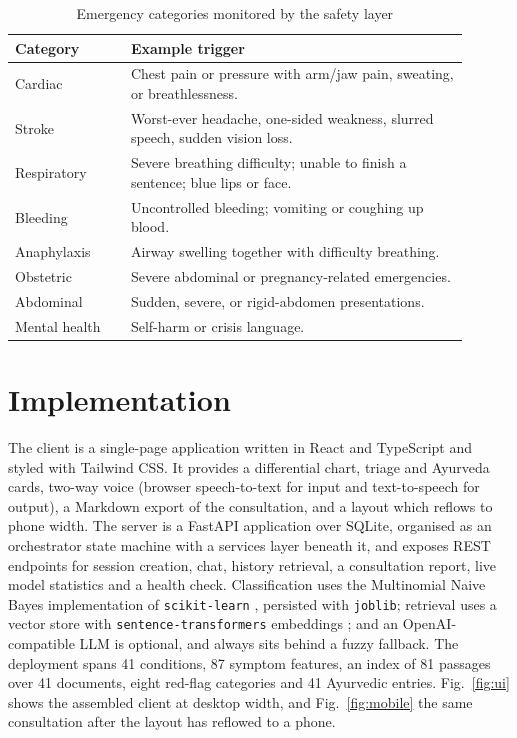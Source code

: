 \documentclass[conference]{IEEEtran}
\newcommand{\code}[1]{\texttt{\small #1}}
\begin{document}
\begin{table}[t]
\caption{Emergency categories monitored by the safety layer}
\label{tab:redflag}
\centering
\footnotesize
\begin{tabular}{@{}p{0.23\linewidth} p{0.67\linewidth}@{}}
\toprule
\textbf{Category} & \textbf{Example trigger}\\
\midrule
Cardiac & Chest pain or pressure with arm/jaw pain, sweating, or
breathlessness.\\[1pt]
Stroke & Worst-ever headache, one-sided weakness, slurred speech, sudden
vision loss.\\[1pt]
Respiratory & Severe breathing difficulty; unable to finish a sentence; blue
lips or face.\\[1pt]
Bleeding & Uncontrolled bleeding; vomiting or coughing up blood.\\[1pt]
Anaphylaxis & Airway swelling together with difficulty breathing.\\[1pt]
Obstetric & Severe abdominal or pregnancy-related emergencies.\\[1pt]
Abdominal & Sudden, severe, or rigid-abdomen presentations.\\[1pt]
Mental health & Self-harm or crisis language.\\
\bottomrule
\end{tabular}
\end{table}

\section{Implementation}

The client is a single-page application written in React and TypeScript and
styled with Tailwind CSS. It provides a differential chart, triage and
Ayurveda cards, two-way voice (browser speech-to-text for input and
text-to-speech for output), a Markdown export of the consultation, and a
layout which reflows to phone width. The server is a FastAPI application over
SQLite, organised as an orchestrator state machine with a services layer
beneath it, and exposes REST endpoints for session creation, chat, history
retrieval, a consultation report, live model statistics and a health check.
Classification uses the Multinomial Naive Bayes implementation of
\code{scikit-learn} \cite{sklearn}, persisted with \code{joblib}; retrieval
uses a vector store with \code{sentence-transformers} embeddings
\cite{sbert}; and an OpenAI-compatible LLM is optional, and always sits
behind a fuzzy fallback. The deployment spans 41 conditions, 87 symptom
features, an index of 81 passages over 41 documents, eight red-flag
categories and 41 Ayurvedic entries. Fig.~\ref{fig:ui} shows the assembled
client at desktop width, and Fig.~\ref{fig:mobile} the same consultation
after the layout has reflowed to a phone.
\end{document}
